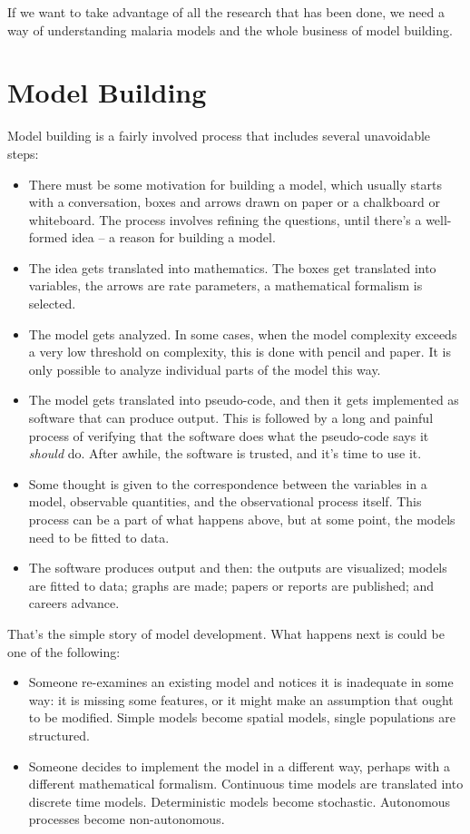 \documentclass[
]{book}
\begin{document}
If we want to take advantage of all the research that has been done, we need a way of understanding malaria models and the whole business of model building.

\hypertarget{model-building}{%
\section{Model Building}\label{model-building}}

Model building is a fairly involved process that includes several unavoidable steps:

\begin{itemize}
\item
  There must be some motivation for building a model, which usually starts with a conversation, boxes and arrows drawn on paper or a chalkboard or whiteboard. The process involves refining the questions, until there's a well-formed idea -- a reason for building a model.
\item
  The idea gets translated into mathematics. The boxes get translated into variables, the arrows are rate parameters, a mathematical formalism is selected.
\item
  The model gets analyzed. In some cases, when the model complexity exceeds a very low threshold on complexity,
  this is done with pencil and paper. It is only possible to analyze individual parts of the model this way.
\item
  The model gets translated into pseudo-code, and then it gets implemented as software that can produce output. This is followed by a long and painful process of verifying that the software does what the pseudo-code says it \emph{should} do. After awhile, the software is trusted, and it's time to use it.
\item
  Some thought is given to the correspondence between the variables in a model, observable quantities, and the observational process itself. This process can be a part of what happens above, but at some point, the models need to be fitted to data.
\item
  The software produces output and then: the outputs are visualized; models are fitted to data; graphs are made; papers or reports are published; and careers advance.
\end{itemize}

That's the simple story of model development. What happens next is could be one of the following:

\begin{itemize}
\item
  Someone re-examines an existing model and notices it is inadequate in some way: it is missing some features, or it might make an assumption that ought to be modified. Simple models become spatial models, single populations are structured.
\item
  Someone decides to implement the model in a different way, perhaps with a different mathematical formalism. Continuous time models are translated into discrete time models. Deterministic models become stochastic. Autonomous processes become non-autonomous.
\end{itemize}
\end{document}
